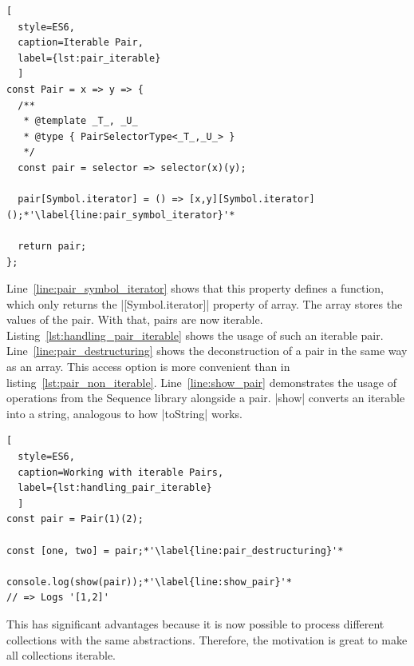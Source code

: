 \begin{lstlisting}[
  style=ES6, 
  caption=Iterable Pair,
  label={lst:pair_iterable}
  ]
const Pair = x => y => {
  /**
   * @template _T_, _U_
   * @type { PairSelectorType<_T_,_U_> }
   */
  const pair = selector => selector(x)(y);

  pair[Symbol.iterator] = () => [x,y][Symbol.iterator]();*'\label{line:pair_symbol_iterator}'*

  return pair;
};
\end{lstlisting}

Line~\ref{line:pair_symbol_iterator} shows that 
this property defines a function, which only returns the |[Symbol.iterator]|
property of array. The array stores the values of the pair. With that, pairs
are now iterable. Listing~\ref{lst:handling_pair_iterable} shows the usage of
such an iterable pair. Line~\ref{line:pair_destructuring} shows the
deconstruction of a pair in the same way as an array. This access option is
more convenient than in listing~\ref{lst:pair_non_iterable}.
Line~\ref{line:show_pair} demonstrates the usage of operations from the Sequence
library alongside a pair. |show| converts an iterable into a string, analogous
to how |toString| works.

\begin{lstlisting}[
  style=ES6, 
  caption=Working with iterable Pairs,
  label={lst:handling_pair_iterable}
  ]
const pair = Pair(1)(2);

const [one, two] = pair;*'\label{line:pair_destructuring}'*

console.log(show(pair));*'\label{line:show_pair}'*
// => Logs '[1,2]'
\end{lstlisting}

This has significant advantages because it is now possible to process different 
collections with the same abstractions. Therefore, the motivation is great to 
make all collections iterable.

